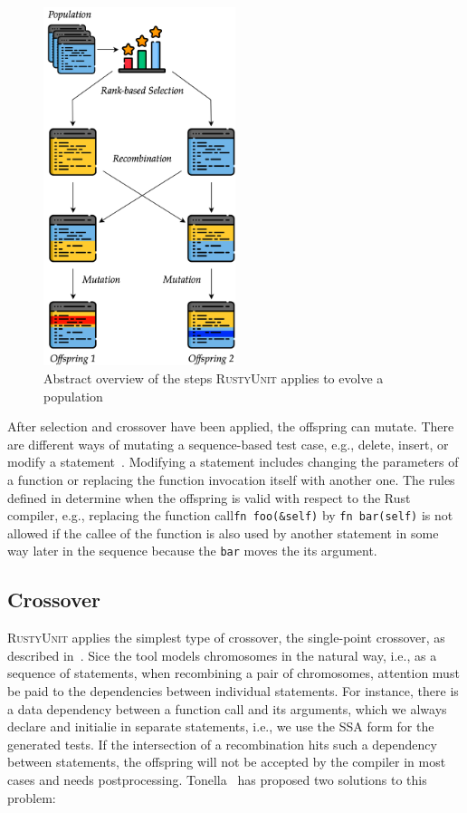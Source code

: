 \documentclass[paper=a4,%
  twoside,%
  BCOR4mm,%
  abstract=true,%
  toc=bibliography,%
  chapterprefix=true,%
  toc=bibliographynumbered,%
  open=right,%
  english,%
  pagesize=pdftex]{scrreprt}
\newcommand{\tech}{\textsc{RustyUnit}\xspace}
\begin{document}
\begin{figure}[h]
\caption{\label{fig:ga-overview}Abstract overview of the steps \tech applies to evolve a population}
\centering
\includegraphics[width=0.5\textwidth]{ga/ga-overview}
\end{figure}

After selection and crossover have been applied, the offspring can mutate. There are different ways of mutating a sequence-based test case, e.g., delete, insert, or modify a statement~\cite{Fraser2012}. Modifying a statement includes changing the parameters of a function or replacing the function invocation itself with another one. The rules defined in  determine when the offspring is valid with respect to the Rust compiler, e.g., replacing the function call\texttt{fn foo(\string&self)} by \texttt{fn bar(self)} is not allowed if the callee of the function is also used by another statement in some way later in the sequence because the \texttt{bar} moves the its argument. 

\subsection{Crossover}
\tech applies the simplest type of crossover, the single-point crossover, as described in~. Sice the tool models chromosomes in the natural way, i.e., as a sequence of statements, when recombining a pair of chromosomes, attention must be paid to the dependencies between individual statements. For instance, there is a data dependency between a function call and its arguments, which we always declare and initialie in separate statements, i.e., we use the \ac{SSA} form for the generated tests. If the intersection of a recombination hits such a dependency between statements, the offspring will not be accepted by the compiler in most cases and needs postprocessing. Tonella~\cite{Tonella2004} has proposed two solutions to this problem:
\end{document}
